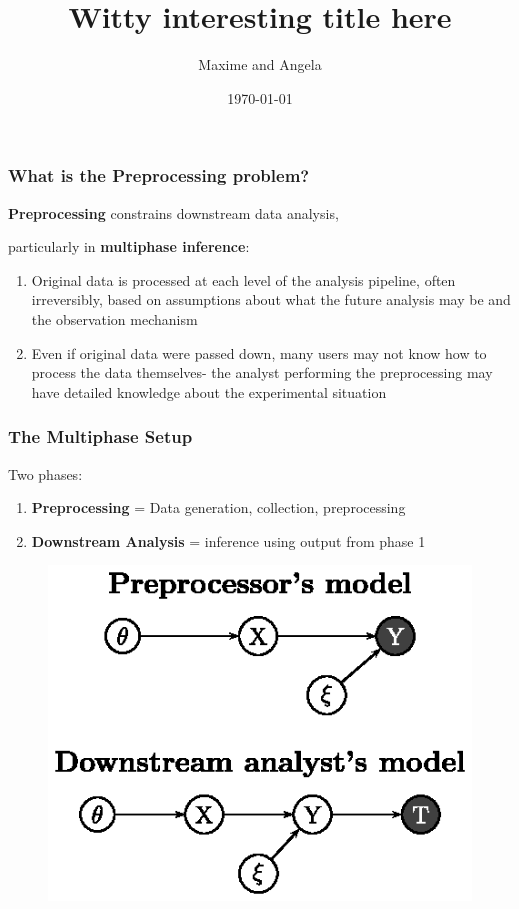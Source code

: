 \documentclass[10pt, compress]{beamer}
\title{Witty interesting title here}
\subtitle{}
\date{\today}
\author{Maxime and Angela}
\begin{document}
\maketitle

\begin{frame}[fragile]
    \frametitle{What is the Preprocessing problem?}
  
  \begin{center}
    \textbf{Preprocessing} constrains downstream data analysis, 
    
    particularly in \textbf{multiphase inference}:
  \end{center}
  
    \begin{enumerate}[<+->]
    \item Original data is processed at each level of the analysis pipeline, often irreversibly, based on assumptions about what the future analysis may be and the observation mechanism
    \vspace*{5mm}
    \item Even if original data were passed down, many users may not know how to process the data themselves- the analyst performing the preprocessing may have detailed knowledge about the experimental situation
  \end{enumerate}
  
\end{frame}

\begin{frame}[fragile]
    \frametitle{The Multiphase Setup}

    Two phases:
    \begin{enumerate}
    \item \textbf{Preprocessing} = Data generation, collection, preprocessing
    \item \textbf{Downstream Analysis} = inference using output from phase 1
    \end{enumerate}
    
    \begin{figure}[h!]
    \centering
    \includegraphics[width=.6\textwidth]{two_phase_setting.ps}
    \end{figure}

\end{frame}
\end{document}
